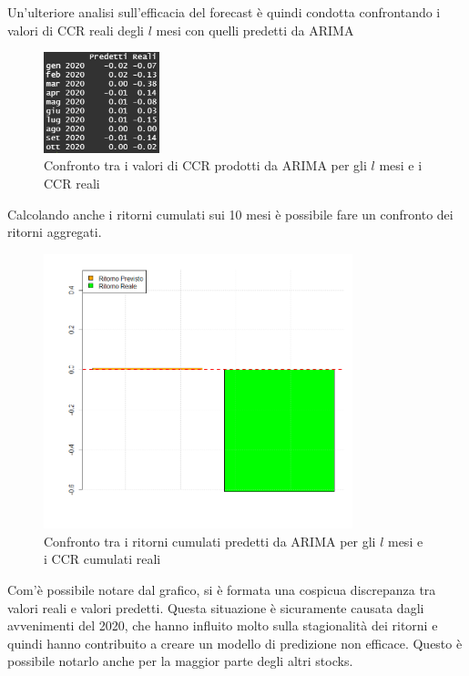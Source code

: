 \documentclass[12pt]{article}
\begin{document}
Un'ulteriore analisi sull'efficacia del forecast è quindi condotta confrontando i valori di CCR reali degli $l$ mesi con quelli predetti da ARIMA
\begin{figure}[!htb]
    \centering
    \includegraphics[width=0.3\textwidth]{immagini/predvsreal.png}
    \caption{Confronto tra i valori di CCR prodotti da ARIMA per gli $l$ mesi e i CCR reali}
\end{figure}
\FloatBarrier
Calcolando anche i ritorni cumulati sui 10 mesi è possibile fare un confronto dei ritorni aggregati.
\begin{figure}[!htb]
    \centering
    \includegraphics[width=0.8\textwidth]{immagini/tenmiplotrp.png}
    \caption{Confronto tra i ritorni cumulati predetti da ARIMA per gli $l$ mesi e i CCR cumulati reali}
\end{figure}
\FloatBarrier
Com'è possibile notare dal grafico, si è formata una cospicua discrepanza tra valori reali e valori predetti. Questa situazione è sicuramente causata dagli avvenimenti del 2020, che hanno influito molto sulla stagionalità dei ritorni e quindi hanno contribuito a creare un modello di predizione non efficace. Questo è possibile notarlo anche per la maggior parte degli altri stocks.
\newpage
\end{document}
